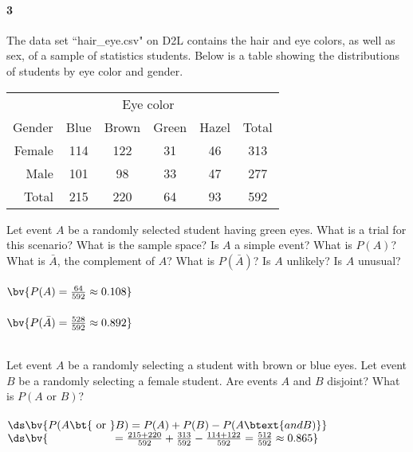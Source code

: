 \documentclass{article}
\begin{document}
\begin{flushleft}
\paragraph{3} The data set ``hair\_eye.csv" on D2L contains the hair and eye colors, as well as sex, of a sample of statistics students. Below is a table showing the distributions of students by eye color and gender.\\
\medskip
\renewcommand{\arraystretch}{1}
{\centering
\begin{tabular}{ r| c c c c | c}
& \multicolumn{4}{c}{Eye color}\\
Gender & Blue & Brown & Green & Hazel & Total\\
\hline
 Female &  114   &  122  &  31  &  46 & 313\\
 Male   & 101  &  98  &  33  &  47 & 277\\
 \hline
 Total	& 215 & 220 & 64 & 93 & 592 
\end{tabular}
\par}
\begin{enumalpha}
\item Let event $A$ be a randomly selected student having green eyes. What is a trial for this scenario? What is the sample space? Is $A$ a simple event? What is $P(A)$? What is $\bar A$, the complement of $A$? What is $P(\bar A)$? Is $A$ unlikely? Is $A$ unusual?\\
\medskip
{}
\medskip
{}\\
$\bv{ P(A) = \frac {64}{592} \approx 0.108}$\\
\\
$\bv{ P(\bar A) = \frac{528}{592}  \approx 0.892}$\\
\\
\vspace{.5in}

\item Let event $A$ be a randomly selecting a student with brown or blue eyes. Let event $B$ be a randomly selecting a female student. Are events $A$ and $B$ disjoint? What is $P(A \text{ or } B)$?\\
\medskip
{}\\
\medskip $\ds \bv{P(A \text{\bt{ or }} B) = P(A) + P(B) - P(A \btext{ and B)} }$\\
\medskip $\ds \bv{\qquad \qquad \qquad =  \frac {215 + 220}{592} + \frac {313}{592} - \frac {114+122}{592} = \frac {512}{592} \approx 0.865}$
\vspace{.5in}


\end{enumalpha}
\end{flushleft}
\end{document}
